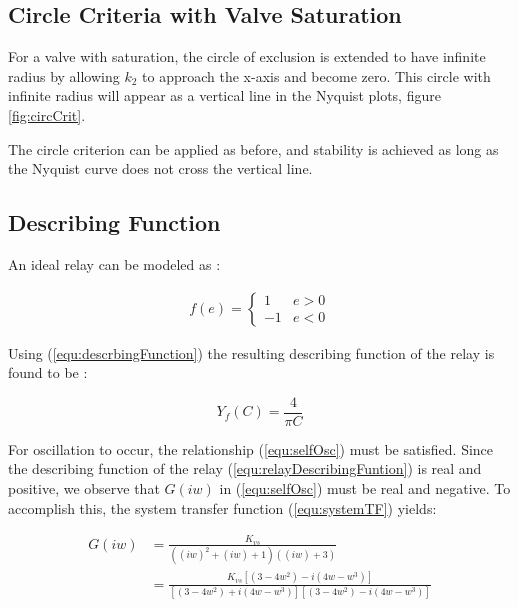 \documentclass[a4paper, titlepage]{article}
\begin{document}
\subsection{Circle Criteria with Valve Saturation}

For a valve with saturation, the circle of exclusion is extended to have infinite radius by allowing $k_{2}$ to approach the x-axis and become zero.  This circle with infinite radius will appear as a vertical line in the Nyquist plots, figure \ref{fig:circCrit}.

The circle criterion can be applied as before, and stability is achieved as long as the Nyquist curve does not cross the vertical line.

\subsection{Describing Function}

An ideal relay can be modeled as \citep[p. 358]{glad00}:

\begin{equation}
\begin{split}
f(e) = \begin{cases}
1 & e > 0 \\
-1 & e <0
\end{cases}
\end{split}
\label{equ:relay}
\end{equation}

Using (\ref{equ:descrbingFunction}) the resulting describing function of the relay is found to be \citep[P. 359]{glad00}:

\begin{equation}
Y_{f}(C) = \frac{4}{\pi C}
\label{equ:relayDescribingFuntion}
\end{equation}

For oscillation to occur, the relationship (\ref{equ:selfOsc}) must be satisfied.
Since the describing function of the relay (\ref{equ:relayDescribingFuntion}) is real and positive, we observe that $G(iw)$ in (\ref{equ:selfOsc}) must be real and negative.
To accomplish this, the system transfer function (\ref{equ:systemTF}) yields:

\begin{equation}
\begin{split}
G(iw) &= \frac{K_{vs}}{((iw)^2+(iw)+1)((iw)+3)}\\
&= \frac{K_{vs}[(3-4w^2)-i(4w-w^3)]}{[(3-4w^2)+i(4w-w^3)][(3-4w^2)-i(4w-w^3)]}
\end{split}
\label{equ:systemTFiw}
\end{equation}
\end{document}

